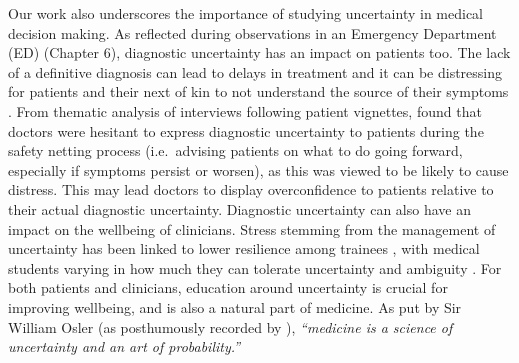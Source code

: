 \documentclass[a4paper, nobind]{templates/ociamthesis}
\begin{document}
Our work also underscores the importance of studying uncertainty in medical decision making. As reflected during observations in an Emergency Department (ED) (Chapter 6), diagnostic uncertainty has an impact on patients too. The lack of a definitive diagnosis can lead to delays in treatment and it can be distressing for patients and their next of kin to not understand the source of their symptoms \autocite{dahm2023}. From thematic analysis of interviews following patient vignettes, \textcite{cox_role_2024} found that doctors were hesitant to express diagnostic uncertainty to patients during the safety netting process (i.e.~advising patients on what to do going forward, especially if symptoms persist or worsen), as this was viewed to be likely to cause distress. This may lead doctors to display overconfidence to patients relative to their actual diagnostic uncertainty. Diagnostic uncertainty can also have an impact on the wellbeing of clinicians. Stress stemming from the management of uncertainty has been linked to lower resilience among trainees \autocite{simpkin_stress_2018}, with medical students varying in how much they can tolerate uncertainty and ambiguity \autocite{hancock_tolerance_2020}. For both patients and clinicians, education around uncertainty is crucial for improving wellbeing, and is also a natural part of medicine. As put by Sir William Osler (as posthumously recorded by \textcite{bean1954}), \emph{``medicine is a science of uncertainty and an art of probability.''}\\
\end{document}
